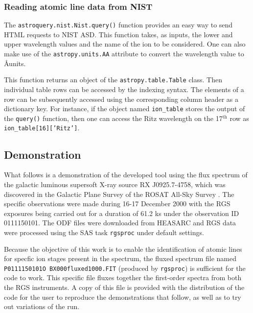             \subsubsection{Reading atomic line data from NIST} \label{tool:rgs-files:line-collection:NIST}
                The \texttt{astroquery.nist.Nist.query()} function provides an easy way to send HTML requests to NIST ASD. This function takes, as inputs, the lower and upper wavelength values and the name of the ion to be considered. One can also make use of the \texttt{astropy.units.AA} attribute to convert the wavelength value to \AA units.
                
                This function returns an object of the \texttt{astropy.table.Table} class. Then individual table rows can be accessed by the indexing syntax. The elements of a row can be subsequently accessed using the corresponding column header as a dictionary key. For instance, if the object named \texttt{ion\_table} stores the output of the \texttt{query()} function, then one can access the Ritz wavelength on the 17$^\text{th}$ row as \texttt{ion\_table[16]['Ritz']}.
        
        \subsection{Demonstration} \label{tool:rgs-files:demonstration}
            What follows is a demonstration of the developed tool using the flux spectrum of the galactic luminous supersoft X-ray source RX J0925.7-4758, which was discovered in the Galactic Plane Survey of the ROSAT All-Sky Survey \cite{motch1994}. The specific observations were made during 16-17 December 2000 with the RGS exposures being carried out for a duration of 61.2 ks \cite{motch02} under the observation ID 0111150101. The ODF files were downloaded from HEASARC and RGS data were processed using the SAS task \texttt{rgsproc} under default settings.
            
            Because the objective of this work is to enable the identification of atomic lines for specfic ion stages present in the spectrum, the fluxed spectrum file named \texttt{P0111150101O BX000fluxed1000.FIT} (produced by \texttt{rgsproc}) is sufficient for the code to work. This specific file fluxes together the first-order spectra from both the RGS instruments. A copy of this file is provided with the distribution of the code for the user to reproduce the demonstrations that follow, as well as to try out variations of the run.
            
